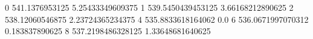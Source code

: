 0 541.1376953125 5.25433349609375
1 539.5450439453125 3.66168212890625
2 538.12060546875 2.23724365234375
4 535.8833618164062 0.0
6 536.0671997070312 0.183837890625
8 537.2198486328125 1.33648681640625
